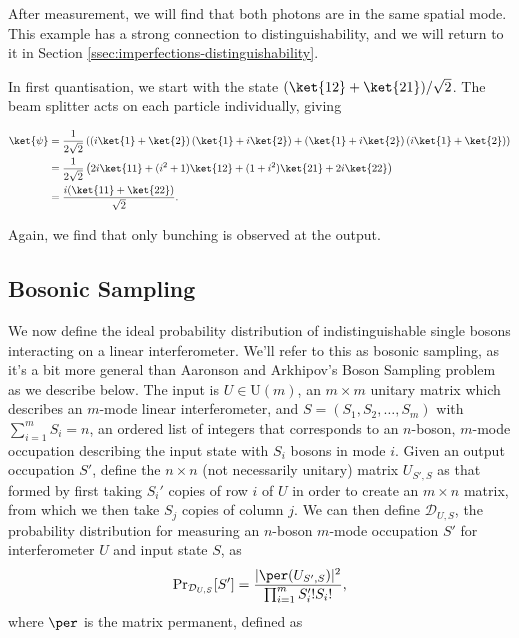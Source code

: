 After measurement, we will find that both photons are in the same spatial mode. This example has a strong connection to distinguishability, and we will return to it in Section \ref{ssec:imperfections-distinguishability}.

In first quantisation, we start with the state $(\ket{12} + \ket{21})/\sqrt{2}$. The beam splitter acts on each particle individually, giving

\begin{align}
\ket{\psi} &= \frac{1}{2\sqrt{2}}\left(\left(i\ket{1} + \ket{2}\right)\left(\ket{1} + i\ket{2}\right) + \left(\ket{1} + i\ket{2}\right)\left(i\ket{1} + \ket{2}\right)\right)\\
&= \frac{1}{2\sqrt{2}}\left(2i\ket{11} + (i^2+1)\ket{12} + (1+i^2)\ket{21} + 2i\ket{22}\right)\\
&= \frac{i(\ket{11}+\ket{22})}{\sqrt{2}}.
\end{align}

Again, we find that only bunching is observed at the output.

\subsection{Bosonic Sampling}
\label{ssec:bosonic-sampling}

We now define the ideal probability distribution of indistinguishable single bosons interacting on a linear interferometer.
We'll refer to this as bosonic sampling, as it's a bit more general than Aaronson and Arkhipov's Boson Sampling problem as we describe below.
The input is $U \in \mathrm{U}(m)$, an $m\times m$ unitary matrix which describes an $m$-mode linear interferometer, and $S = (S_1,S_2,\dots,S_m)$ with $\sum_{i=1}^m S_i =n$, an ordered list of integers that corresponds to an $n$-boson, $m$-mode occupation describing the input state with $S_i$ bosons in mode $i$. 
Given an output occupation $S'$, define the $n \times n$ (not necessarily unitary) matrix $U_{S',S}$ as that formed by first taking $S_i'$ copies of row $i$ of $U$ in order to create an $m\times n$ matrix, from which we then take $S_j$ copies of column $j$. 
We can then define $\mathcal{D}_{U,S}$, the probability distribution for measuring an $n$-boson $m$-mode occupation $S'$ for interferometer $U$ and input state $S$, as
\begin{equation}\label{eqn:bs-distribution}
\textrm{Pr}_{\mathcal{D}_{U,S}}[S'] = \frac{|\per(U_{S',S})|^2}{\prod_{i=1}^m S_i'! S_i!} ,
\end{equation}
where $\per$ is the matrix permanent, defined as

